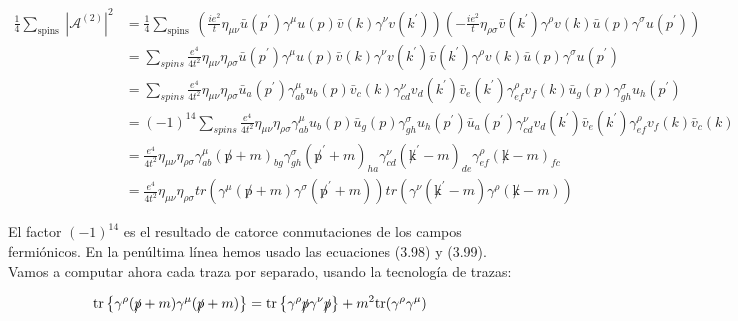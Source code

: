 \begin{equation}
  \begin{aligned}
  \frac{1}{4} \sum_{\text {spins }}\left|\mathcal{A}^{(2)}\right|^2 & =\frac{1}{4} \sum_{\text {spins }}\left(\frac{i e^2}{t} \eta_{\mu \nu} \bar{u}\left(p^{\prime}\right) \gamma^\mu u(p) \bar{v}(k) \gamma^\nu v\left(k^{\prime}\right)\right)\left(-\frac{i e^2}{t} \eta_{\rho \sigma} \bar{v}\left(k^{\prime}\right) \gamma^\rho v(k) \bar{u}(p) \gamma^\sigma u\left(p^{\prime}\right)\right) \\
  & =\sum_{s p i n s} \frac{e^4}{4 t^2} \eta_{\mu \nu} \eta_{\rho \sigma} \bar{u}\left(p^{\prime}\right) \gamma^\mu u(p) \bar{v}(k) \gamma^\nu v\left(k^{\prime}\right) \bar{v}\left(k^{\prime}\right) \gamma^\rho v(k) \bar{u}(p) \gamma^\sigma u\left(p^{\prime}\right) \\
  & =\sum_{s p i n s} \frac{e^4}{4 t^2} \eta_{\mu \nu} \eta_{\rho \sigma} \bar{u}_a\left(p^{\prime}\right) \gamma_{a b}^\mu u_b(p) \bar{v}_c(k) \gamma_{c d}^\nu v_d\left(k^{\prime}\right) \bar{v}_e\left(k^{\prime}\right) \gamma_{e f}^\rho v_f(k) \bar{u}_g(p) \gamma_{g h}^\sigma u_h\left(p^{\prime}\right) \\
  & =(-1)^{14} \sum_{s p i n s} \frac{e^4}{4 t^2} \eta_{\mu \nu} \eta_{\rho \sigma} \gamma_{a b}^\mu u_b(p) \bar{u}_g(p) \gamma_{g h}^\sigma u_h\left(p^{\prime}\right) \bar{u}_a\left(p^{\prime}\right) \gamma_{c d}^\nu v_d\left(k^{\prime}\right) \bar{v}_e\left(k^{\prime}\right) \gamma_{e f}^\rho v_f(k) \bar{v}_c(k) \\
  & =\frac{e^4}{4 t^2} \eta_{\mu \nu} \eta_{\rho \sigma} \gamma_{a b}^\mu(\not p+m)_{b g} \gamma_{g h}^\sigma\left(\not p^{\prime}+m\right)_{h a} \gamma_{c d}^\nu\left(\not k^{\prime}-m\right)_{d e} \gamma_{e f}^\rho(\not k-m)_{f c} \\
  & =\frac{e^4}{4 t^2} \eta_{\mu \nu} \eta_{\rho \sigma} t r\left(\gamma^\mu(\not p+m) \gamma^\sigma\left(\not p^{\prime}+m\right)\right) t r\left(\gamma^\nu\left(\not k^{\prime}-m\right) \gamma^\rho(\not k-m)\right)
  \end{aligned}
  \end{equation}

El factor $(-1)^{14}$ es el resultado de catorce conmutaciones de los campos fermiónicos. En la penúltima línea hemos usado las ecuaciones (3.98) y (3.99). Vamos a computar ahora cada traza por separado, usando la tecnología de trazas:

\begin{equation}
\text{tr} \left\{ \gamma^\rho (\slashed{p} + m) \gamma^\mu (\slashed{p} + m) \right\} = \text{tr} \left\{ \gamma^\rho \slashed{p} \gamma^\nu \slashed{p} \right\} + m^2 \text{tr}(\gamma^\rho \gamma^\mu)
\end{equation}

